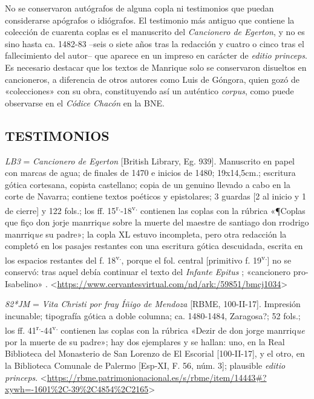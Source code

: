 \documentclass[11pt,a4paper,twoside]{article}
\newcommand{\comillas}[1]{«#1»}
\newcommand{\tsup}[1]{\textsuperscript{#1}}
\begin{document}
%
No se conservaron autógrafos de alguna copla ni testimonios que puedan considerarse apógrafos o idiógrafos. El testimonio más antiguo que contiene la colección de cuarenta coplas es el manuscrito del \textit{Cancionero de Egerton}, y no es sino hasta ca. 1482-83 --seis o siete años tras la redacción y cuatro o cinco tras el fallecimiento del autor-- que aparece en un impreso en carácter de \textit{editio princeps}. Es necesario destacar que los textos de Manrique solo se conservaron disueltos en cancioneros, a diferencia de otros autores como Luis de Góngora, quien gozó de \comillas{colecciones} con su obra, constituyendo así un auténtico \textit{corpus}, como puede observarse en el \textit{Códice Chacón} en la BNE.\par

\subsection*{\centering\fontsize{11}{14}\selectfont TESTIMONIOS}

\textit{LB3} = \textit{Cancionero de Egerton} [British Library, Eg. 939].
%
Manuscrito en papel con marcas de agua; de finales de 1470 e inicios de 1480; 19x14,5cm.; escritura gótica cortesana, copista castellano; copia de un genuino llevado a cabo en la corte de Navarra; contiene textos poéticos y epistolares; 3 guardas [2 al inicio y 1 de cierre] y 122 fols.; los ff. 15\tsup{r.}-18\tsup{v.} contienen las coplas con la rúbrica \comillas{¶Coplas que fiço don jorje manrriq\textit{ue} sobre la muerte del maestre de santiago don rrodrigo manrriq\textit{ue} su padre}; la copla XL estuvo incompleta, pero otra redacción la completó en los pasajes restantes con una escritura gótica descuidada, escrita en los espacios restantes del f. 18\tsup{v.}, porque el fol. central [primitivo f. 19\tsup{v.}] no se conservó: tras aquel debía continuar el texto del \textit{Infante Epitus} \textcite{Beltrán2011}; \comillas{cancionero pro-Isabelino} \parencite{Severin2000}. <\url{https://www.cervantesvirtual.com/nd/ark:/59851/bmcj1034}>\par

\textit{82*JM} = \textit{Vita Christi por fray Íñigo de Mendoza} [RBME, 100-II-17].
%
Impresión incunable; tipografía gótica a doble columna; ca. 1480-1484, Zaragosa?; 52 fols.; los ff. 41\tsup{r.}-44\tsup{v.} contienen las coplas con la rúbrica \comillas{Dezir de don jorge manrriq\textit{ue} por la muerte de su padre}; hay dos ejemplares y se hallan: uno, en la Real Biblioteca del Monasterio de San Lorenzo de El Escorial [100-II-17], y el otro, en la Biblioteca Comunale de Palermo [Esp-XI, F. 56, núm. 3]; plausible \textit{editio princeps}. <\url{https://rbme.patrimonionacional.es/s/rbme/item/14443#?xywh=-1601%2C-39%2C4854%2C2165}>\par
\end{document}
